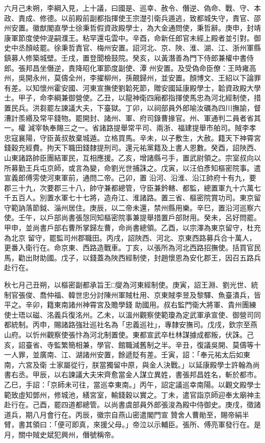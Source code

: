 \begin{pinyinscope}
 六月己未朔，李綱入見，上十議，曰國是、巡幸、赦令、僭逆、偽命、戰、守、本
 政、責成、修德。以前殿前副都指揮使王宗濋引衛兵遁逃，致都城失守，責官、邵州安置。徽猷閣直學士徐秉哲假資政殿學士，為大金通問使，秉哲辭。庚申，封靖康軍節度使仲湜嗣濮王。粘罕還屯雲中。辛酉，命新任郎官未經上殿者並引對。御史中丞顏岐罷。徐秉哲責官、梅州安置。詔河北、京、陜、淮、湖、江、浙州軍縣鎮募人修築城壁。壬戌，置登聞檢鼓院。癸亥，以黃潛善為門下侍郎兼權中書侍郎。張邦昌坐僭逆，責降昭化軍節度副使、潭
 州安置。及受偽命臣僚：王時雍高州，吳開永州，莫儔全州，李擢柳州，孫覿歸州，並安置。顏博文、王紹以下論罪有差。以知懷州霍安國、河東宣撫使劉韐死節，贈安國延康殿學士，韐資政殿大學士。甲子，命李綱兼御營使。乙丑，以龍神衛四廂都指揮使馬忠為河北經制使，措置民兵。洪芻罷左諫議大夫，下臺獄。丁卯，以祠部員外郎喻汝礪為四川撫諭，督漕計羨緡及常平錢物。罷開封、諸州、軍、府司錄曹掾官。州、軍通判二員者省其一。權
 減宰執奉賜三之一。省諸路提舉常平司、兩浙、福建提舉市舶司。賊李孝忠寇襄陽，守臣黃叔敖棄城遁。立格買馬。辛未，以子敷生，大赦。籍天下神霄宮錢穀充經費。拘天下職田錢隸提刑司。還元祐黨籍及上書人恩數。癸酉，詔陜西、山東諸路帥臣團結軍民，互相應援。乙亥，增諸縣弓手，置武尉領之。宗室叔向以所募勤王兵屯京師，或言為變，命劉光世捕誅之。戊寅，以汪伯彥知樞密院事。遣宣義郎傅雱使河東軍前，通問二帝。己卯，置
 沿河、沿淮、沿江帥府十有九，要郡三十九，次要郡三十八，帥守兼都總管，守臣兼鈐轄、都監，總置軍九十六萬七千五百人。別置水軍七十七將，造舟江、淮諸路。置三省、樞密院賞功司。東京留守範訥落節鉞、淄州居住。庚辰，以二帝未還，禁州縣用樂。辛巳，置沿河巡察六使。壬午，以戶部尚書張愨同知樞密院事兼提舉措置戶部財用。癸未，呂好問罷。甲申，並尚書戶部右曹所掌歸左曹，命尚書總領。乙酉，以宗澤為東京留守，杜充為北京
 留守，罷監司州郡職田。丙戌，詔陜西、河北、京東西路募兵合十萬人，更番入衛行在。命京東、西路造戰車。丁亥，以張所為河北西路招撫使。括買官民馬，勸出財助國。戊子，以錢蓋為陜西經制使，封趙懷恩為安化郡王，因召五路兵赴行在。



 秋七月己丑朔，以樞密副都承旨王□燮為河東經制使。庚寅，詔王淵、劉光世、統制官張俊、喬仲福、韓世忠分討陳州軍賊杜用、京東賊李昱及黎驛、魚臺潰兵，皆平之。辛卯，籍東南諸州神霄宮及贍學錢
 助國用。叔右監門衛大將軍、貴州團練使士珸以磁、洺義兵復洺州。乙未，以溫州觀察使範瓊為定武軍承宣使、御營司同都統制。丙申，賜諸路強壯巡社名為「忠義巡社」，專隸安撫司。戊戌，欽宗至燕山府。以忻州觀察使張忭為河北制置使。東都宣武卒杜林謀據成都叛，伏誅。己亥，詔臺省、寺監繁簡相兼，學官、館職減舊制之半。辛丑，復議吳開、莫儔等十一人罪，並廣南、江、湖諸州安置，餘遞貶有差。壬寅，詔：「奉元祐太后如東南，六宮及衛
 士家屬從行，朕當獨留中原，與金人決戰。」以延康殿學士許翰為尚書右丞。甲辰，以右諫議大夫宋齊愈當金人謀立異姓，書張邦昌姓名，斬於都市。乙巳，手詔：「京師未可往，當巡幸東南。」丙午，詔定議巡幸南陽。以觀文殿學士範致虛知鄧州，修城池，繕宮室，輸錢穀以實之。丁未，遣官詣京師迎奉太廟神主赴行在。己酉，罷四道都總管。以尚書虞部員外郎張浚為殿中侍御史。庚戌，徵諸道兵，期八月會行在。丙辰，徽宗自燕山密遣閣門宣
 贊舍人曹勛至，賜帝絹半臂，書其領曰：「便可即真，來援父母。」帝泣以示輔臣。張所、傅亮軍發行在。是月，關中賊史斌犯興州，僭號稱帝。




\end{pinyinscope}
